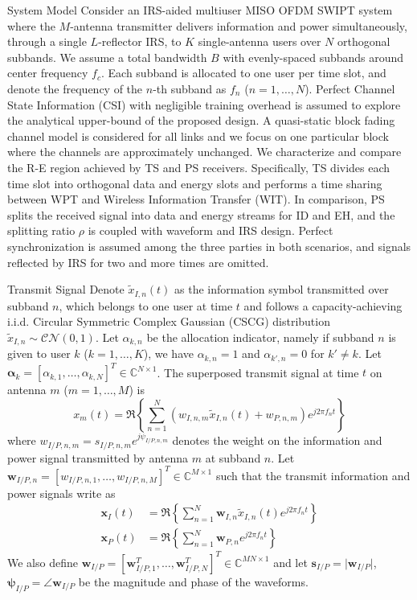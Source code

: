 \documentclass{IEEEtran}
\begin{document}
\begin{section}{System Model}
	Consider an IRS-aided multiuser MISO OFDM SWIPT system where the $M$-antenna transmitter delivers information and power simultaneously, through a single $L$-reflector IRS, to $K$ single-antenna users over $N$ orthogonal subbands. We assume a total bandwidth $B$ with evenly-spaced subbands around center frequency $f_c$. Each subband is allocated to one user per time slot, and denote the frequency of the $n$-th subband as $f_n$ ($n=1,\dots,N$). Perfect Channel State Information (CSI) with negligible training overhead is assumed to explore the analytical upper-bound of the proposed design. A quasi-static block fading channel model is considered for all links and we focus on one particular block where the channels are approximately unchanged. We characterize and compare the R-E region achieved by TS and PS receivers. Specifically, TS divides each time slot into orthogonal data and energy slots and performs a time sharing between WPT and Wireless Information Transfer (WIT). In comparison, PS splits the received signal into data and energy streams for ID and EH, and the splitting ratio $\rho$ is coupled with waveform and IRS design. Perfect synchronization is assumed among the three parties in both scenarios, and signals reflected by IRS for two and more times are omitted.
	\begin{subsection}{Transmit Signal}
		Denote $\tilde{x}_{I,n}(t)$ as the information symbol transmitted over subband $n$, which belongs to one user at time $t$ and follows a capacity-achieving i.i.d. Circular Symmetric Complex Gaussian (CSCG) distribution $\tilde{x}_{I,n}\sim\mathcal{CN}(0,1)$. Let $\alpha_{k,n}$ be the allocation indicator, namely if subband $n$ is given to user $k$ ($k=1,\dots,K$), we have $\alpha_{k,n}=1$ and $\alpha_{k',n}=0$ for $k' \ne k$. Let $\boldsymbol{\alpha}_k=[\alpha_{k,1},\dots,\alpha_{k,N}]^T \in \mathbb{C}^{N \times 1}$. The superposed transmit signal at time $t$ on antenna $m$ ($m=1,\dots,M$) is
		\begin{equation}\label{eq:x_m}
			x_m(t)=\Re\left\{\sum_{n=1}^N\left({w_{I,n,m}\tilde{x}_{I,n}(t)}+w_{P,n,m}\right){e^{j2{\pi}{f_n}{t}}}\right\}
		\end{equation}
		where $w_{I/P,n,m}=s_{I/P,n,m}e^{j\psi_{I/P,n,m}}$ denotes the weight on the information and power signal transmitted by antenna $m$ at subband $n$. Let $\boldsymbol{w}_{I/P,n}=[w_{I/P,n,1},\dots,w_{I/P,n,M}]^T \in \mathbb{C}^{M \times 1}$ such that the transmit information and power signals write as
		\begin{align}
			\boldsymbol{x}_{I}(t) &= \Re{\left\{\sum_{n=1}^N\boldsymbol{w}_{I,n}\tilde{x}_{I,n}(t){e^{j2{\pi}{f_n}{t}}}\right\}}\label{eq:x_I}\\
			\boldsymbol{x}_{P}(t) &= \Re{\left\{\sum_{n=1}^N\boldsymbol{w}_{P,n}{e^{j2{\pi}{f_n}{t}}}\right\}}\label{eq:x_P}
		\end{align}
		We also define $\boldsymbol{w}_{I/P}=[\boldsymbol{w}_{I/P,1}^T,\dots,\boldsymbol{w}_{I/P,N}^T]^T \in \mathbb{C}^{MN \times 1}$ and let $\boldsymbol{s}_{I/P}=\lvert{\boldsymbol{w}_{I/P}}\rvert$, $\boldsymbol{\psi}_{I/P}=\angle{\boldsymbol{w}_{I/P}}$ be the magnitude and phase of the waveforms.
	\end{subsection}


\end{section}
\end{document}
